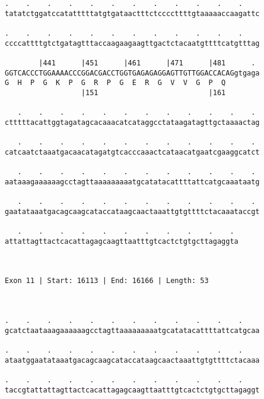 \documentclass{article}
\begin{document}
\begin{Verbatim}
.    .    .    .    .    .    .    .    .    .    .    .    
tatatctggatccatatttttatgtgataactttctccccttttgtaaaaaccaagattc
                                                            
.    .    .    .    .    .    .    .    .    .    .    .    
ccccattttgtctgatagtttaccaagaagaagttgactctacaatgttttcatgtttag
                                                            
        |441      |451      |461      |471      |481      . 
GGTCACCCTGGAAAACCCGGACGACCTGGTGAGAGAGGAGTTGTTGGACCACAGgtgaga
G  H  P  G  K  P  G  R  P  G  E  R  G  V  V  G  P  Q        
                  |151                          |161        
  
   .    .    .    .    .    .    .    .    .    .    .    . 
ctttttacattggtagatagcacaaacatcataggcctataagatagttgctaaaactag
                                                            
   .    .    .    .    .    .    .    .    .    .    .    . 
catcaatctaaatgacaacatagatgtcacccaaactcataacatgaatcgaaggcatct
                                                            
   .    .    .    .    .    .    .    .    .    .    .    . 
aataaagaaaaaagcctagttaaaaaaaaatgcatatacattttattcatgcaaataatg
                                                            
   .    .    .    .    .    .    .    .    .    .    .    . 
gaatataaatgacagcaagcataccataagcaactaaattgtgttttctacaaataccgt
                                                            
   .    .    .    .    .    .    .    .    .    .    . 
attattagttactcacattagagcaagttaatttgtcactctgtgcttagaggta
                                                       
                                                       
 
Exon 11 | Start: 16113 | End: 16166 | Length: 53



.    .    .    .    .    .    .    .    .    .    .    .    
gcatctaataaagaaaaaagcctagttaaaaaaaaatgcatatacattttattcatgcaa
                                                            
.    .    .    .    .    .    .    .    .    .    .    .    
ataatggaatataaatgacagcaagcataccataagcaactaaattgtgttttctacaaa
                                                            
.    .    .    .    .    .    .    .    .    .    .    .    
taccgtattattagttactcacattagagcaagttaatttgtcactctgtgcttagaggt
                                                            

\end{Verbatim}
\end{document}
